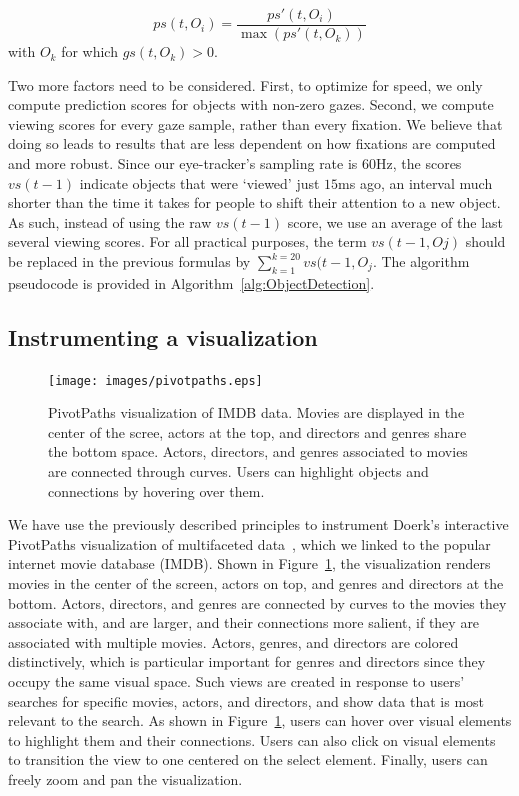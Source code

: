 \begin{equation}
ps(t,O_i) = \frac{ps'(t, O_i)}{\max (ps'(t, O_k))}
\label{eq:PS}
\end{equation}
with $O_k$ for which $gs(t,O_k) >0$.

Two more factors need to be considered. First, to optimize for speed, we only compute prediction scores for objects with non-zero gazes. Second, we compute viewing scores for every gaze sample, rather than every fixation. We believe that doing so leads to results that are less dependent on how fixations are computed and more robust. Since our eye-tracker's sampling rate is $60$Hz, the scores $vs(t-1)$ indicate objects that were `viewed' just $15$ms ago, an interval much shorter than the time it takes for people to shift their attention to a new object. As such, instead of using the raw $vs(t-1)$ score, we use an average of the last several viewing scores. For all practical purposes, the term $vs(t-1,Oj)$ should be replaced in the previous formulas by $ \sum_{k=1}^{k=20}{vs(t-1, O_j}$. The algorithm pseudocode is provided in Algorithm~\ref{alg:ObjectDetection}.


\subsection{Instrumenting a visualization}

\begin{figure}[htb]
  \centering
  \texttt{[image: images/pivotpaths.eps]}
  \caption{PivotPaths visualization of IMDB data. Movies are displayed in the center of the scree, actors at the top, and directors and genres share the bottom space. Actors, directors, and genres associated to movies are connected through curves. Users can highlight objects and connections by hovering over them.}
	\label{fig:pivotpaths}
\end{figure}
We have use the previously described principles to instrument Doerk's interactive PivotPaths visualization of multifaceted data~\cite{dork2012pivotpaths}, which we linked to the popular internet movie database (IMDB). Shown in Figure~\ref{fig:pivotpaths}, the visualization renders movies in the center of the screen, actors on top, and genres and directors at the bottom. Actors, directors, and genres are connected by curves to the movies they associate with, and are larger, and their connections more salient, if they are associated with multiple movies. Actors, genres, and directors are colored distinctively, which is particular important for genres and directors since they occupy the same visual space. Such views are created in response to users' searches for specific movies, actors, and directors, and show data that is most relevant to the search. As shown in Figure~\ref{fig:pivotpaths}, users can hover over visual elements to highlight them and their connections. Users can also click on visual elements to transition the view to one centered on the select element. Finally, users can freely zoom and pan the visualization. 

